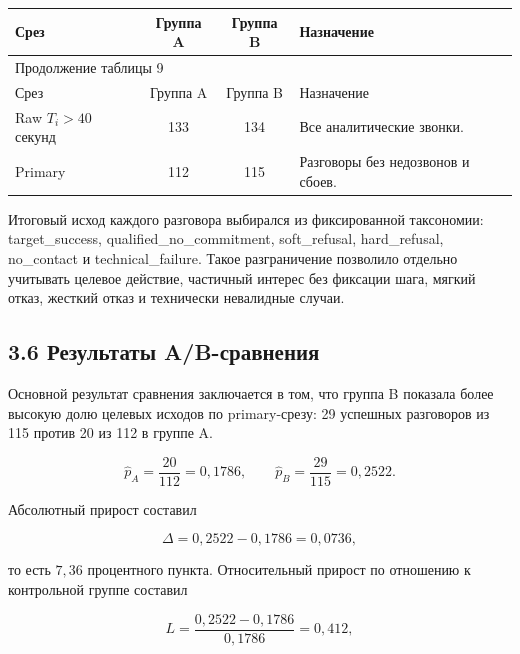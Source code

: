 \documentclass[a4paper,14pt]{extarticle}
\renewcommand{\texttt}[1]{\textnormal{#1}}
\newcounter{none}
\begin{document}
{\def\LTcaptype{none} %
\begin{longtable}[]{|l|c|c|l|}
\hline
Срез & Группа A & Группа B & Назначение \\
\hline
\endfirsthead
\hline\multicolumn{4}{|l|}{\small Продолжение таблицы 9}\\
\hline
Срез & Группа A & Группа B & Назначение \\
\hline
\endhead
\hline
\endfoot
\hline
\endlastfoot
Raw \(T_i > 40\) секунд & 133 & 134 & Все аналитические звонки. \\
Primary & 112 & 115 & Разговоры без недозвонов и сбоев. \\
\end{longtable}
}

Итоговый исход каждого разговора выбирался из фиксированной таксономии:
\texttt{target\_\allowbreak{}success}, \texttt{qualified\_\allowbreak{}no\_\allowbreak{}commitment},
\texttt{soft\_\allowbreak{}refusal}, \texttt{hard\_\allowbreak{}refusal}, \texttt{no\_\allowbreak{}contact} и
\texttt{technical\_\allowbreak{}failure}. Такое разграничение позволило отдельно
учитывать целевое действие, частичный интерес без фиксации шага, мягкий
отказ, жесткий отказ и технически невалидные случаи.

\subsection{3.6 Результаты
A/B-сравнения}\label{ux440ux435ux437ux443ux43bux44cux442ux430ux442ux44b-ab-ux441ux440ux430ux432ux43dux435ux43dux438ux44f}

Основной результат сравнения заключается в том, что группа \texttt{B}
показала более высокую долю целевых исходов по primary-срезу: 29
успешных разговоров из 115 против 20 из 112 в группе \texttt{A}.

\begin{equation}
\hat p_A = \frac{20}{112} = 0{,}1786,
\qquad
\hat p_B = \frac{29}{115} = 0{,}2522.
\end{equation}

Абсолютный прирост составил

\begin{equation}
\Delta = 0{,}2522 - 0{,}1786 = 0{,}0736,
\end{equation}

то есть \(7{,}36\) процентного пункта. Относительный прирост по
отношению к контрольной группе составил

\begin{equation}
L = \frac{0{,}2522 - 0{,}1786}{0{,}1786} = 0{,}412,
\end{equation}
\end{document}

